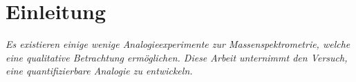 \chapter{Einleitung}

   
\textit{Es existieren einige wenige Analogieexperimente zur Massenspektrometrie, welche eine qualitative Betrachtung ermöglichen. Diese Arbeit unternimmt den Versuch, eine quantifizierbare Analogie zu entwickeln.}


